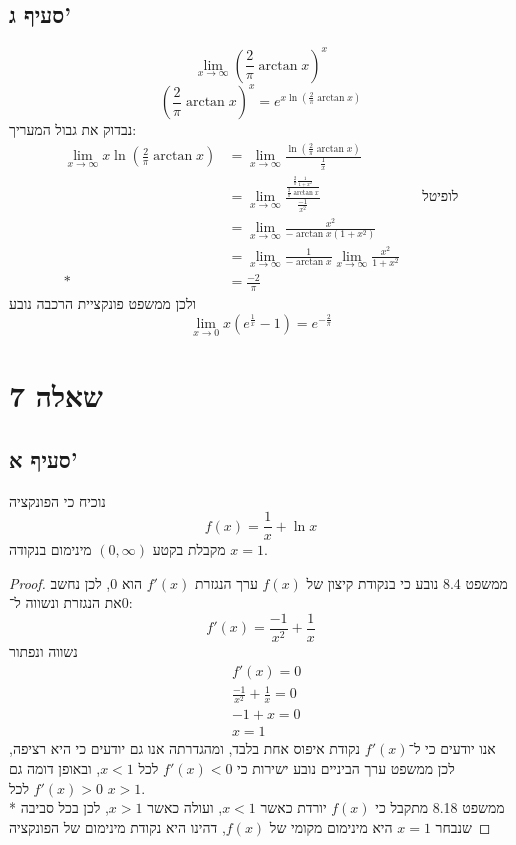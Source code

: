 \subsection{סעיף ג'}
\[
	\lim_{x \to \infty} {\left( \frac{2}{\pi} \arctan x \right)}^x
\]
\[
	{\left( \frac{2}{\pi} \arctan x \right)}^x
	= e^{x \ln \left( \frac{2}{\pi} \arctan x \right)}
\]
נבדוק את גבול המעריך:
\begin{align*}
	\lim_{x \to \infty} x \ln \left( \frac{2}{\pi} \arctan x \right)
	& = \lim_{x \to \infty} \frac{\ln \left( \frac{2}{\pi} \arctan x \right)}{\frac{1}{x}} \\
	& = \lim_{x \to \infty} \frac{\frac{\frac{2}{\pi} \frac{1}{1 + x^2}}{\frac{2}{\pi} \arctan x}}{\frac{-1}{x^2}} && \text{לופיטל} \\
	& = \lim_{x \to \infty} \frac{x^2}{-\arctan x (1 + x^2)} \\
	& = \lim_{x \to \infty} \frac{1}{-\arctan x } \lim_{x \to \infty} \frac{x^2}{1 + x^2} \\*
	& = \frac{-2}{\pi}
\end{align*}
ולכן ממשפט פונקציית הרכבה נובע
\[
	\lim_{x \to 0} x (e^\frac{1}{x} - 1) = e^{-\frac{2}{\pi}}
\]

\section{שאלה 7}
\subsection{סעיף א'}
נוכיח כי הפונקציה
\[
	f(x) = \frac{1}{x} + \ln x
\]
מקבלת בקטע $(0, \infty)$ מינימום בנקודה $x = 1$.
\begin{proof}
	ממשפט 8.4 נובע כי בנקודת קיצון של $f(x)$ ערך הנגזרת $f'(x)$ הוא $0$, לכן נחשב את הנגזרת ונשווה ל־$0$:
	\[
		f'(x) = \frac{-1}{x^2} + \frac{1}{x}
	\]
	נשווה ונפתור
	\begin{align*}
		& f'(x) = 0 \\
		& \frac{-1}{x^2} + \frac{1}{x} = 0 \\
		& -1 + x = 0 \\
		& x = 1
	\end{align*}
	אנו יודעים כי ל־$f'(x)$ נקודת איפוס אחת בלבד, ומהגדרתה אנו גם יודעים כי היא רציפה,
	לכן ממשפט ערך הביניים נובע ישירות כי $f'(x) < 0$ לכל $x < 1$, ובאופן דומה גם $f'(x) > 0$ לכל $x > 1$. \\*
	ממשפט 8.18 מתקבל כי $f(x)$ יורדת כאשר $x < 1$, ועולה כאשר $x > 1$, לכן בכל סביבה שנבחר $x = 1$ היא מינימום מקומי של $f(x)$,
	דהינו היא נקודת מינימום של הפונקציה
\end{proof}


